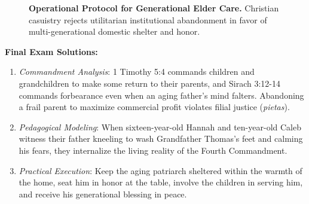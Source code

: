 \documentclass[11pt]{report}
\begin{document}
\begin{figure}[H]
\caption{\textbf{Operational Protocol for Generational Elder Care.} Christian casuistry rejects utilitarian institutional abandonment in favor of multi-generational domestic shelter and honor.}
\label{fig:elder_protocol}
\end{figure}

\begin{blackboard}
\textbf{Final Exam Solutions:}
\begin{enumerate}
    \item \textit{Commandment Analysis}: 1 Timothy 5:4 commands children and grandchildren to make some return to their parents, and Sirach 3:12-14 commands forbearance even when an aging father's mind falters. Abandoning a frail parent to maximize commercial profit violates filial justice (\textit{pietas}).
    \item \textit{Pedagogical Modeling}: When sixteen-year-old Hannah and ten-year-old Caleb witness their father kneeling to wash Grandfather Thomas's feet and calming his fears, they internalize the living reality of the Fourth Commandment.
    \item \textit{Practical Execution}: Keep the aging patriarch sheltered within the warmth of the home, seat him in honor at the table, involve the children in serving him, and receive his generational blessing in peace.
\end{enumerate}
\end{blackboard}
\end{document}
